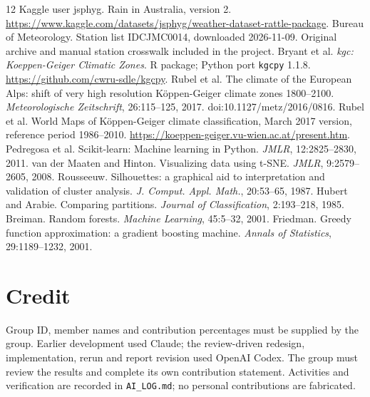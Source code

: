 \documentclass{article}
\begin{document}
\clearpage
\begin{thebibliography}{12}\small
{} Kaggle user jsphyg. Rain in Australia, version 2. \url{https://www.kaggle.com/datasets/jsphyg/weather-dataset-rattle-package}.
 Bureau of Meteorology. Station list IDCJMC0014, downloaded 2026-11-09. Original archive and manual station crosswalk included in the project.
 Bryant et al. \emph{kgc: Koeppen-Geiger Climatic Zones}. R package; Python port \texttt{kgcpy} 1.1.8. \url{https://github.com/cwru-sdle/kgcpy}.
 Rubel et al. The climate of the European Alps: shift of very high resolution K\"oppen-Geiger climate zones 1800--2100. \emph{Meteorologische Zeitschrift}, 26:115--125, 2017. doi:10.1127/metz/2016/0816.
 Rubel et al. World Maps of K\"oppen-Geiger climate classification, March 2017 version, reference period 1986--2010. \url{https://koeppen-geiger.vu-wien.ac.at/present.htm}.
 Pedregosa et al. Scikit-learn: Machine learning in Python. \emph{JMLR}, 12:2825--2830, 2011.
 van der Maaten and Hinton. Visualizing data using t-SNE. \emph{JMLR}, 9:2579--2605, 2008.
 Rousseeuw. Silhouettes: a graphical aid to interpretation and validation of cluster analysis. \emph{J. Comput. Appl. Math.}, 20:53--65, 1987.
 Hubert and Arabie. Comparing partitions. \emph{Journal of Classification}, 2:193--218, 1985.
 Breiman. Random forests. \emph{Machine Learning}, 45:5--32, 2001.
 Friedman. Greedy function approximation: a gradient boosting machine. \emph{Annals of Statistics}, 29:1189--1232, 2001.
\end{thebibliography}
\section*{Credit}
Group ID, member names and contribution percentages must be supplied by the group. Earlier development used Claude; the review-driven redesign, implementation, rerun and report revision used OpenAI Codex. The group must review the results and complete its own contribution statement. Activities and verification are recorded in \texttt{AI\_LOG.md}; no personal contributions are fabricated.
\end{document}
